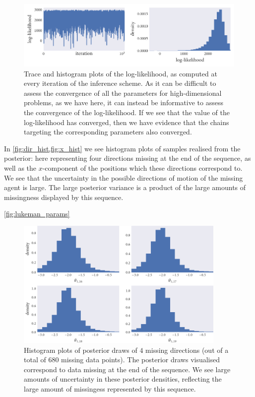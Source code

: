 \begin{figure}[tb]
  \includegraphics{log_likelihood.pdf}
  \caption{Trace and histogram plots of the log-likelihood, as computed at
    every iteration of the inference scheme. As it can be difficult to assess
    the convergence of all the parameters for high-dimensional problems, as
    we have here, it can instead be informative to assess the convergence of
    the log-likelihood. If we see that the value of the log-likelihood has
    converged, then we have evidence that the chains targeting the corresponding
    parameters also converged.}
    \label{fig:log_ll}
\end{figure}

In \cref{fig:dir_hist,fig:x_hist} we see histogram plots of samples realised
from the posterior: here representing four directions missing at the end of the
sequence, as well as the $x$-component of the positions which these directions
correspond to. We see that the uncertainty in the possible directions of motion
of the missing agent is large. The large posterior variance is a product of the
large amounts of missingness displayed by this sequence.

\cref{fig:lukeman_params}

\begin{figure}[tb]
  \includegraphics[width=0.9\textwidth]{dir_hist.pdf}
  \caption{Histogram plots of posterior draws of $4$ missing directions (out of
    a total of $680$ missing data points). The posterior draws visualised
    correspond to data missing at the end of the sequence. We see large amounts
    of uncertainty in these posterior densities, reflecting the large amount of
    missingess represented by this sequence.}
  \label{fig:dir_hist}
\end{figure}

